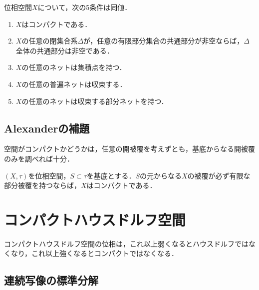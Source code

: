 \documentclass[uplatex,dvipdfmx]{jsreport}
\begin{document}
\begin{theorem}[(AC)]
    位相空間$X$について，次の5条件は同値．
    \begin{enumerate}
        \item $X$はコンパクトである．
        \item $X$の任意の閉集合系$\Delta$が，任意の有限部分集合の共通部分が非空ならば，$\Delta$全体の共通部分は非空である．
        \item $X$の任意のネットは集積点を持つ．
        \item $X$の任意の普遍ネットは収束する．
        \item $X$の任意のネットは収束する部分ネットを持つ．
    \end{enumerate}
\end{theorem}

\subsection{Alexanderの補題}

\begin{tcolorbox}[colframe=ForestGreen, colback=ForestGreen!10!white,breakable,colbacktitle=ForestGreen!40!white,coltitle=black,fonttitle=\bfseries\sffamily,
title=]
    空間がコンパクトかどうかは，任意の開被覆を考えずとも，基底からなる開被覆のみを調べれば十分．
\end{tcolorbox}

\begin{theorem}
    $(X,\tau)$を位相空間，$S\subset\tau$を基底とする．$S$の元からなる$X$の被覆が必ず有限な部分被覆を持つならば，$X$はコンパクトである．
\end{theorem}

\section{コンパクトハウスドルフ空間}

\begin{tcolorbox}[colframe=ForestGreen, colback=ForestGreen!10!white,breakable,colbacktitle=ForestGreen!40!white,coltitle=black,fonttitle=\bfseries\sffamily,
title=]
    コンパクトハウスドルフ空間の位相は，これ以上弱くなるとハウスドルフではなくなり，これ以上強くなるとコンパクトではなくなる．
\end{tcolorbox}

\subsection{連続写像の標準分解}
\end{document}
